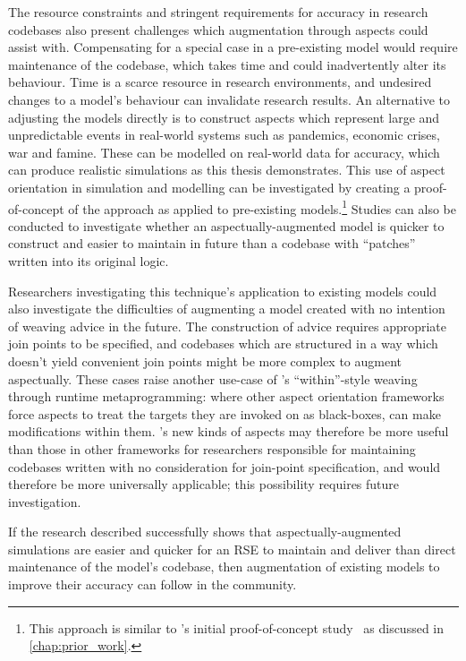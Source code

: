 The resource constraints and stringent requirements for accuracy in research
codebases also present challenges which augmentation through aspects could
assist with. Compensating for a special case in a pre-existing model would
require maintenance of the codebase, which takes time and could inadvertently
alter its behaviour. Time is a scarce resource in research environments, and
undesired changes to a model's behaviour can invalidate research results. An
alternative to adjusting the models directly is to construct aspects which
represent large and unpredictable events in real-world systems such as
pandemics, economic crises, war and famine. These can be modelled on real-world
data for accuracy, which can produce realistic simulations as this thesis
demonstrates. This use of aspect orientation in simulation and modelling can be
investigated by creating a proof-of-concept of the approach as applied to
pre-existing models.\footnote{This approach is similar to \pdsf{}'s initial
proof-of-concept study~\cite{wallis2018caise} as discussed in
\cref{chap:prior_work}.} Studies can also be conducted to investigate
whether an aspectually-augmented model is quicker to construct and easier to
maintain in future than a codebase with ``patches'' written into its original
logic.

Researchers investigating this technique's application to existing models could
also investigate the difficulties of augmenting a model created with no
intention of weaving advice in the future. The construction of advice requires
appropriate join points to be specified, and codebases which are structured in a
way which doesn't yield convenient join points might be more complex to augment
aspectually. These cases raise another use-case of \pdsf{}'s ``within''-style
weaving through runtime metaprogramming: where other aspect orientation
frameworks force aspects to treat the targets they are invoked on as
black-boxes, \pdsf can make modifications within them. \pdsf{}'s new kinds of
aspects may therefore be more useful than those in other frameworks for
researchers responsible for maintaining codebases written with no consideration
for join-point specification, and would therefore be more universally
applicable; this possibility requires future investigation.

If the research described successfully shows that aspectually-augmented
simulations are easier and quicker for an RSE to maintain and deliver than
direct maintenance of the model's codebase, then augmentation of existing models
to improve their accuracy can follow in the community.
    
